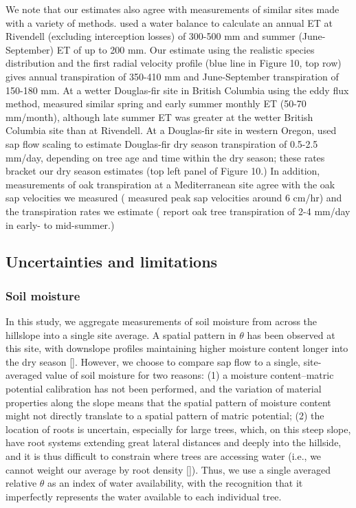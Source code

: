 We note that our estimates also agree with measurements of similar sites made with a variety of methods.  \cite{salve2012rain} used a water balance to calculate an annual ET at Rivendell (excluding interception losses) of 300-500 mm and summer (June-September) ET  of up to 200 mm.  Our estimate using the realistic species distribution and the first radial velocity profile (blue line in Figure 10, top row) gives annual transpiration of 350-410 mm and June-September transpiration of 150-180 mm.  At a wetter Douglas-fir site in British Columbia using the eddy flux method, \cite{jassal2009evapotranspiration} measured similar spring and early summer monthly ET (50-70 mm/month), although late summer ET was greater at the wetter British Columbia site than at Rivendell.  At a Douglas-fir site in western Oregon, \cite{moore2004structural} used sap flow scaling to estimate Douglas-fir dry season transpiration of 0.5-2.5 mm/day, depending on tree age and time within the dry season; these rates bracket our dry season estimates (top left panel of Figure 10.)  In addition, measurements of oak transpiration at a Mediterranean site agree with the oak sap velocities we measured (\cite{fisher2007towers} measured peak sap velocities around 6 cm/hr) and the transpiration rates we estimate (\cite{chen2008observations} report oak tree transpiration of 2-4 mm/day in early- to mid-summer.)

\subsection{Uncertainties and limitations}
\label{sec:sapflow_soilmoisture}

\subsubsection{Soil moisture}
In this study, we aggregate measurements of soil moisture from across the hillslope into a single site average.  A spatial pattern in $\theta$ has been observed at this site, with downslope profiles maintaining higher moisture content longer into the dry season [\cite{salve2012rain}].  However, we choose to compare sap flow to a single, site-averaged value of soil moisture for two reasons: (1) a moisture content--matric potential calibration has not been performed, and the variation of material properties along the slope means that the spatial pattern of moisture content might not directly translate to a spatial pattern of matric potential; (2) the location of roots is uncertain, especially for large trees, which, on this steep slope, have root systems extending great lateral distances and deeply into the hillside, and it is thus difficult to constrain where trees are accessing water (i.e., we cannot weight our average by root density [\cite{chen1994impact}]).  Thus, we use a single averaged relative $\theta$ as an index of water availability, with the recognition that it imperfectly represents the water available to each individual tree.

